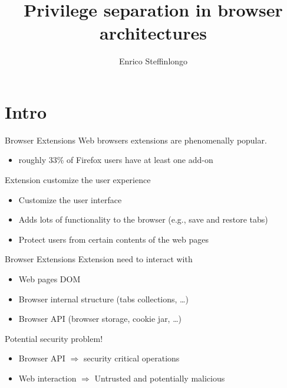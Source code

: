 \documentclass[11pt]{beamer}
\author{Enrico Steffinlongo}
\title{Privilege separation in browser architectures}
\institute[Universities Here and There] %
{
  Università Ca' Foscari - Computer science
}
\begin{document}
\begin{frame}
\titlepage
\end{frame}


\begin{frame}
\tableofcontents
\end{frame}

\section{Intro}
\begin{frame}{Browser Extensions}
Web browsers extensions are phenomenally popular.
\begin{itemize}
\item roughly 33\% of Firefox users have at least one add-on
\end{itemize}
Extension customize the user experience
\begin{itemize}
\item Customize the user interface
\item Adds lots of functionality to the browser (e.g., save and restore tabs)
\item Protect users from certain contents of the web pages 
\end{itemize}
\end{frame}

\begin{frame}{Browser Extensions}
Extension need to interact with
\begin{itemize}
\item Web pages DOM
\item Browser internal structure (tabs collections, \dots)
\item Browser API (browser storage, cookie jar, \dots)
\end{itemize}
Potential security problem!
\begin{itemize}
\item Browser API $\Rightarrow$ security critical operations\\
\item Web interaction $\Rightarrow$ Untrusted and potentially malicious\\
\end{itemize}
\end{frame}
\end{document}
